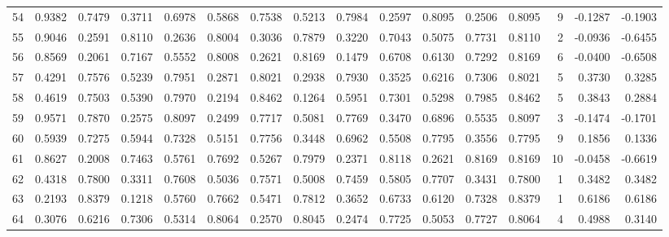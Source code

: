 \begin{tabular}{lrrrrrrrrrrrrrrr}
54  &      0.9382 &  0.7479 &  0.3711 &  0.6978 &  0.5868 &  0.7538 &  0.5213 &  0.7984 &  0.2597 &  0.8095 &   0.2506 &     0.8095 &      9 &                   -0.1287 &                    -0.1903 \\
55  &      0.9046 &  0.2591 &  0.8110 &  0.2636 &  0.8004 &  0.3036 &  0.7879 &  0.3220 &  0.7043 &  0.5075 &   0.7731 &     0.8110 &      2 &                   -0.0936 &                    -0.6455 \\
56  &      0.8569 &  0.2061 &  0.7167 &  0.5552 &  0.8008 &  0.2621 &  0.8169 &  0.1479 &  0.6708 &  0.6130 &   0.7292 &     0.8169 &      6 &                   -0.0400 &                    -0.6508 \\
57  &      0.4291 &  0.7576 &  0.5239 &  0.7951 &  0.2871 &  0.8021 &  0.2938 &  0.7930 &  0.3525 &  0.6216 &   0.7306 &     0.8021 &      5 &                    0.3730 &                     0.3285 \\
58  &      0.4619 &  0.7503 &  0.5390 &  0.7970 &  0.2194 &  0.8462 &  0.1264 &  0.5951 &  0.7301 &  0.5298 &   0.7985 &     0.8462 &      5 &                    0.3843 &                     0.2884 \\
59  &      0.9571 &  0.7870 &  0.2575 &  0.8097 &  0.2499 &  0.7717 &  0.5081 &  0.7769 &  0.3470 &  0.6896 &   0.5535 &     0.8097 &      3 &                   -0.1474 &                    -0.1701 \\
60  &      0.5939 &  0.7275 &  0.5944 &  0.7328 &  0.5151 &  0.7756 &  0.3448 &  0.6962 &  0.5508 &  0.7795 &   0.3556 &     0.7795 &      9 &                    0.1856 &                     0.1336 \\
61  &      0.8627 &  0.2008 &  0.7463 &  0.5761 &  0.7692 &  0.5267 &  0.7979 &  0.2371 &  0.8118 &  0.2621 &   0.8169 &     0.8169 &     10 &                   -0.0458 &                    -0.6619 \\
62  &      0.4318 &  0.7800 &  0.3311 &  0.7608 &  0.5036 &  0.7571 &  0.5008 &  0.7459 &  0.5805 &  0.7707 &   0.3431 &     0.7800 &      1 &                    0.3482 &                     0.3482 \\
63  &      0.2193 &  0.8379 &  0.1218 &  0.5760 &  0.7662 &  0.5471 &  0.7812 &  0.3652 &  0.6733 &  0.6120 &   0.7328 &     0.8379 &      1 &                    0.6186 &                     0.6186 \\
64  &      0.3076 &  0.6216 &  0.7306 &  0.5314 &  0.8064 &  0.2570 &  0.8045 &  0.2474 &  0.7725 &  0.5053 &   0.7727 &     0.8064 &      4 &                    0.4988 &                     0.3140 \\

\end{tabular}
